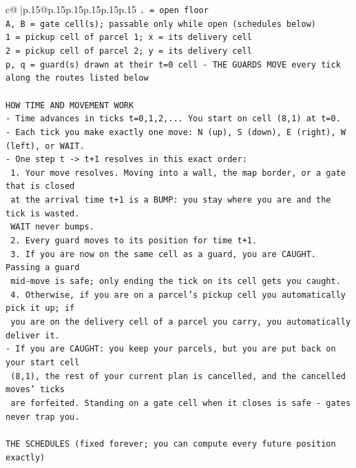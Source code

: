 \documentclass{article}
\begin{document}
{\begin{supertabular}{c@{$\;$}|p{.15\linewidth}@{}p{.15\linewidth}p{.15\linewidth}p{.15\linewidth}p{.15\linewidth}p{.15\linewidth}}
{{{\texttt{. = open floor} \\
\texttt{A, B = gate cell(s); passable only while open (schedules below)} \\
\texttt{1 = pickup cell of parcel 1; x = its delivery cell} \\
\texttt{2 = pickup cell of parcel 2; y = its delivery cell} \\
\texttt{p, q = guard(s) drawn at their t=0 cell {-} THE GUARDS MOVE every tick along the routes listed below} \\
\\ 
\texttt{HOW TIME AND MOVEMENT WORK} \\
\texttt{{-} Time advances in ticks t=0,1,2,... You start on cell (8,1) at t=0.} \\
\texttt{{-} Each tick you make exactly one move: N (up), S (down), E (right), W (left), or WAIT.} \\
\texttt{{-} One step t {-}> t+1 resolves in this exact order:} \\
\texttt{  1. Your move resolves. Moving into a wall, the map border, or a gate that is closed} \\
\texttt{     at the arrival time t+1 is a BUMP: you stay where you are and the tick is wasted.} \\
\texttt{     WAIT never bumps.} \\
\texttt{  2. Every guard moves to its position for time t+1.} \\
\texttt{  3. If you are now on the same cell as a guard, you are CAUGHT. Passing a guard} \\
\texttt{     mid{-}move is safe; only ending the tick on its cell gets you caught.} \\
\texttt{  4. Otherwise, if you are on a parcel's pickup cell you automatically pick it up; if} \\
\texttt{     you are on the delivery cell of a parcel you carry, you automatically deliver it.} \\
\texttt{{-} If you are CAUGHT: you keep your parcels, but you are put back on your start cell} \\
\texttt{  (8,1), the rest of your current plan is cancelled, and the cancelled moves' ticks} \\
\texttt{  are forfeited. Standing on a gate cell when it closes is safe {-} gates never trap you.} \\
\\ 
\texttt{THE SCHEDULES (fixed forever; you can compute every future position exactly)} \\
}}}
\end{supertabular}}
\end{document}
